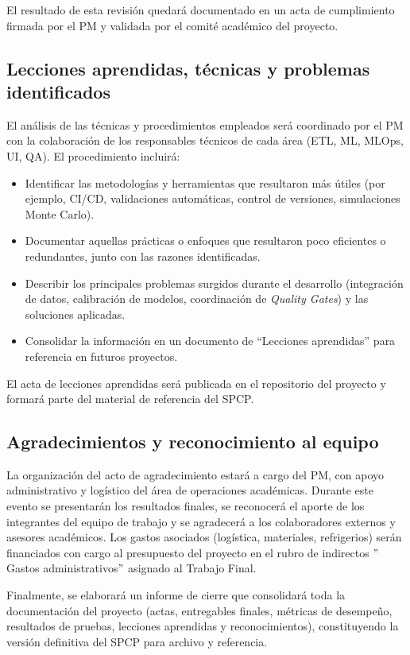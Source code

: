 \documentclass[12pt]
{charter}
\begin{document}
El resultado de esta revisión quedará documentado en un acta de cumplimiento firmada por el PM y validada por el comité académico del proyecto.

\subsection{Lecciones aprendidas, técnicas y problemas identificados}
El análisis de las técnicas y procedimientos empleados será coordinado por el PM con la colaboración de los responsables técnicos de cada área (ETL, ML, MLOps, UI, QA).  
El procedimiento incluirá:
\begin{itemize}
  \item Identificar las metodologías y herramientas que resultaron más útiles (por ejemplo, CI/CD, validaciones automáticas, control de versiones, simulaciones Monte Carlo).
  \item Documentar aquellas prácticas o enfoques que resultaron poco eficientes o redundantes, junto con las razones identificadas.
  \item Describir los principales problemas surgidos durante el desarrollo (integración de datos, calibración de modelos, coordinación de \textit{Quality Gates}) y las soluciones aplicadas.
  \item Consolidar la información en un documento de “Lecciones aprendidas” para referencia en futuros proyectos.
\end{itemize}

El acta de lecciones aprendidas será publicada en el repositorio del proyecto y formará parte del material de referencia del SPCP.

\subsection{Agradecimientos y reconocimiento al equipo}
La organización del acto de agradecimiento estará a cargo del PM, con apoyo administrativo y logístico del área de operaciones académicas.  
Durante este evento se presentarán los resultados finales, se reconocerá el aporte de los integrantes del equipo de trabajo y se agradecerá a los colaboradores externos y asesores académicos.  
Los gastos asociados (logística, materiales, refrigerios) serán financiados con cargo al presupuesto del proyecto en el rubro de indirectos $"$Gastos administrativos$"$ asignado al Trabajo Final.

Finalmente, se elaborará un informe de cierre que consolidará toda la documentación del proyecto (actas, entregables finales, métricas de desempeño, resultados de pruebas, lecciones aprendidas y reconocimientos), constituyendo la versión definitiva del SPCP para archivo y referencia.
\end{document}
